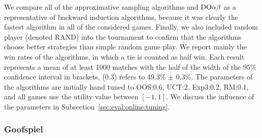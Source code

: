 We compare all of the approximative sampling algorithms and $\textrm{DO}\alpha\beta$ as a representative of backward induction algorithms, because it was clearly the fastest algorithm in all of the considered games. 
Finally, we also included random player (denoted RAND) into the tournament to confirm that the algorithms choose better strategies than simple random game play.
We report mainly the win rates of the algorithms, in which a tie is counted as half win.
Each result represents a mean of at least 1000 matches with the half of the width of the 95\% confidence interval in brackets, (0.3) refers to 49.3\% $\pm$ 0.3\%. 
The parameters of the algorithms are initially hand tuned to OOS:0.6, UCT:2, Exp3:0.2, RM:0.1, and all games use the utility value between $[-1,1]$. 
We discuss the influence of the parameters in Subsection~\ref{sec:eval:online:tuning}.

\subsubsection{Goofspiel}


